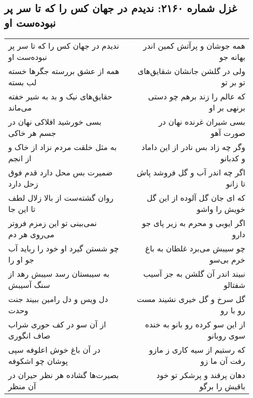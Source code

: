 \begin{center}
\section*{غزل شماره ۲۱۶۰: ندیدم در جهان کس را که تا سر پر نبوده‌ست او}
\label{sec:2160}
\begin{longtable}{l p{0.5cm} r}
ندیدم در جهان کس را که تا سر پر نبوده‌ست او
&&
همه جوشان و پرآتش کمین اندر بهانه جو
\\
همه از عشق بررسته جگرها خسته لب بسته
&&
ولی در گلشن جانشان شقایق‌های تو بر تو
\\
حقایق‌های نیک و بد به شیر خفته می‌ماند
&&
که عالم را زند برهم چو دستی برنهی بر او
\\
بسی خورشید افلاکی نهان در جسم هر خاکی
&&
بسی شیران غرنده نهان در صورت آهو
\\
به مثل خلقت مردم نزاد از خاک و از انجم
&&
وگر چه زاد بس نادر از این داماد و کدبانو
\\
ضمیرت بس محل دارد قدم فوق زحل دارد
&&
اگر چه اندر آب و گل فروشد پاش تا زانو
\\
روان گشته‌ست از بالا زلال لطف تا این جا
&&
که ای جان گل آلوده از این گل خویش را واشو
\\
نمی‌بینی تو این زمزم فروتر می‌روی هر دم
&&
اگر ایوبی و محرم به زیر پای جو دارو
\\
چو شستن گیرد او خود را رباید آب جو او را
&&
چو سیبش می‌برد غلطان به باغ خرم بی‌سو
\\
به سیبستان رسد سیبش رهد از سنگ آسیبش
&&
نبیند اندر آن گلشن به جز آسیب شفتالو
\\
دل ویس و دل رامین ببیند جنت وحدت
&&
گل سرخ و گل خیری نشیند مست رو با رو
\\
از آن سو در کف حوری شراب صاف انگوری
&&
از این سو کرده رو بانو به خنده سوی روبانو
\\
در آن باغ خوش اعلوفه سپی پوشان چو اشکوفه
&&
که رستیم از سیه کاری ز مازو رفت آن ما زو
\\
بصیرت‌ها گشاده هر نظر حیران در آن منظر
&&
دهان پرقند و پرشکر تو خود باقیش را برگو
\\
\end{longtable}
\end{center}
